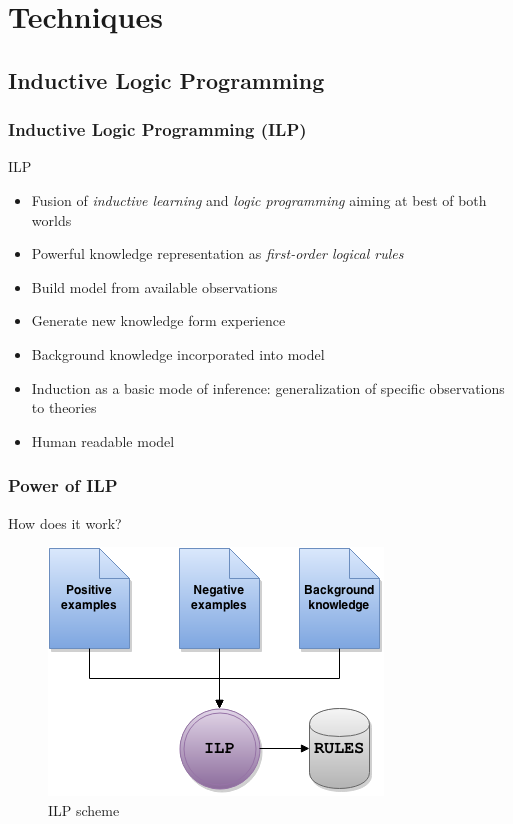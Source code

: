 \documentclass[09pt]{beamer}
\begin{document}
\section{Techniques}

  \subsection{Inductive Logic Programming}
  \begin{frame}%
    \frametitle{Inductive Logic Programming (ILP)}
    \begin{block}{ILP~\cite{muggleton1994inductive,muggleton1995inverse}}
      \begin{itemize}
        \item Fusion of \emph{inductive learning} and \emph{logic programming} aiming at best of both worlds
        \item Powerful knowledge representation as \emph{first-order logical rules}
        \item Build model from available observations
        \item Generate new knowledge form experience
        \item Background knowledge incorporated into model
        \item Induction as a basic mode of inference: generalization of specific observations to theories
        \item Human readable model
      \end{itemize}
    \end{block}
  \end{frame}

  \begin{frame}%
    \frametitle{Power of ILP}
    \begin{block}{How does it work?}
        \begin{figure}
          \centering
          \includegraphics[scale=.5]{../paper/gfx/ilp}
          \caption{ILP scheme\label{fig:ilp}}
        \end{figure}
    \end{block}
  \end{frame}
\end{document}
